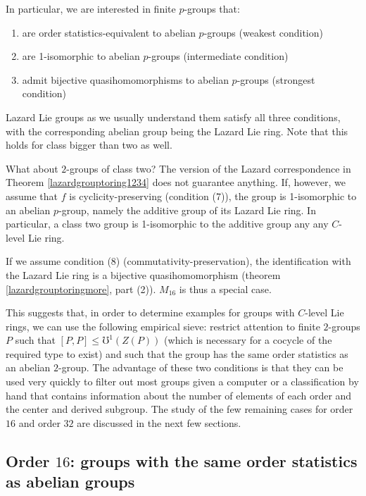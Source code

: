 \documentclass[10pt]{amsart}
\begin{document}
In particular, we are interested in finite $p$-groups that:

\begin{enumerate}
\item are order statistics-equivalent to abelian $p$-groups (weakest
  condition)
\item are 1-isomorphic to abelian $p$-groups (intermediate condition)
\item admit bijective quasihomomorphisms to abelian $p$-groups
  (strongest condition)
\end{enumerate}

Lazard Lie groups as we usually understand them satisfy all three
conditions, with the corresponding abelian group being the Lazard Lie
ring. Note that this holds for class bigger than two as well.

What about $2$-groups of class two? The version of the Lazard
correspondence in Theorem \ref{lazardgrouptoring1234} does not
guarantee anything. If, however, we assume that $f$ is
cyclicity-preserving (condition (7)), the group is 1-isomorphic to an
abelian $p$-group, namely the additive group of its Lazard Lie
ring. In particular, a class two group is 1-isomorphic to the additive
group any any $C$-level Lie ring. 

If we assume condition (8) (commutativity-preservation), the
identification with the Lazard Lie ring is a bijective
quasihomomorphism (theorem \ref{lazardgrouptoringmore}, part
(2)). $M_{16}$ is thus a special case.

This suggests that, in order to determine examples for groups with
$C$-level Lie rings, we can use the following empirical sieve:
restrict attention to finite $2$-groups $P$ such that $[P,P] \le
\mho^1(Z(P))$ (which is necessary for a cocycle of the required type
to exist) and such that the group has the same order statistics as an
abelian $2$-group. The advantage of these two conditions is that they
can be used very quickly to filter out most groups given a computer or
a classification by hand that contains information about the number of
elements of each order and the center and derived subgroup. The study
of the few remaining cases for order $16$ and order $32$ are discussed
in the next few sections.


\subsection{Order $16$: groups with the same order statistics as abelian groups}
\end{document}
